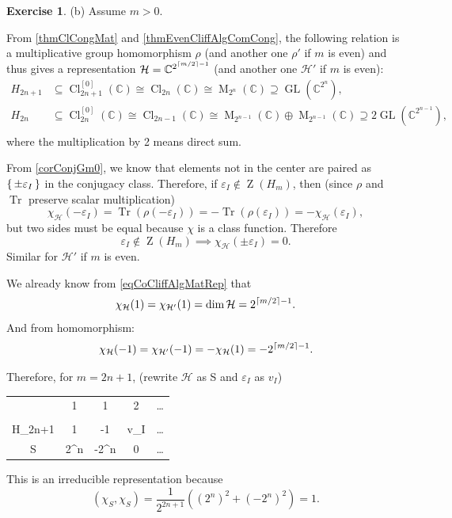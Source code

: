 \documentclass[12pt, letterpaper]{article}
\newcommand{\co}{\mathbb{C}}
\newcommand{\GL}{\operatorname{GL}}
\newcommand{\MM}{\operatorname{M}}
\newcommand{\ZZ}{\operatorname{Z}}
\newcommand{\Tr}{\operatorname{Tr}}
\newcommand{\Cl}{\operatorname{Cl}}
\DeclarePairedDelimiter\ceil{\lceil}{\rceil}
\theoremstyle{definition}
\theoremstyle{remark}
\theoremstyle{definition}
\newtheorem{exe}{Exercise}[section]
\theoremstyle{plain}
\numberwithin{equation}{section}
\begin{document}
	\begin{exe}\label{exe3.9}
		(b)
		Assume $m>0$.
		
		From \ref{thmClCongMat} and \ref{thmEvenCliffAlgComCong}, 
		the following relation is a multiplicative group homomorphism $\rho$ (and another one $\rho'$ if $m$ is even)
		and thus gives a representation $\mathcal{H}=\co^{2^{\ceil{m/2}-1}}$ (and another one $\mathcal{H}'$ if $m$ is even):
		\[
		\begin{aligned}
			H_{2n+1}&\subseteq\Cl_{2n+1}^{[0]}(\co)\cong\Cl_{2n}(\co)\cong\MM_{2^n}(\co)\supseteq \GL(\co^{2^n}),\\
			H_{2n}&\subseteq\Cl_{2n}^{[0]}(\co)\cong\Cl_{2n-1}(\co)\cong\MM_{2^{n-1}}(\co)\oplus\MM_{2^{n-1}}(\co)\supseteq2\GL(\co^{2^{n-1}}),\\
		\end{aligned}
		\]
		where the multiplication by 2 means direct sum.
		
		From \ref{corConjGm0}, we know that elements not in the center are paired as
		$\set{\pm \varepsilon_I}$ in the conjugacy class. Therefore, if $\varepsilon_I\notin \ZZ(H_m)$, then
		(since $\rho$ and $\Tr$ preserve scalar multiplication)
		\[\chi_{\mathcal{H}}(-\varepsilon_I)=\Tr(\rho(-\varepsilon_I))=-\Tr(\rho(\varepsilon_I))=-\chi_{\mathcal{H}}(\varepsilon_I), \]
		but two sides must be equal because $\chi$ is a class function.
		Therefore \[\varepsilon_I\notin \ZZ(H_m)\implies\chi_{\mathcal{H}}(\pm\varepsilon_I)=0.\]
		Similar for $\mathcal{H'}$ if $m$ is even.
		
		We already know from \eqref{eqCoCliffAlgMatRep} that
		\[\chi_{\mathcal{H}}(1)=\chi_{\mathcal{H}'}(1)=\dim \mathcal{H}=2^{\ceil{m/2}-1} .\]
		And from homomorphism:
		\[\chi_{\mathcal{H}}(-1) =\chi_{\mathcal{H}'}(-1)=-\chi_{\mathcal{H}}(1)=-2^{\ceil{m/2}-1} .\]
		
		Therefore, for $m=2n+1$, (rewrite $\mathcal{H}$ as S and $\varepsilon_I$ as $v_I$)
		\begin{center}
			\begin{tabular}{C | C C C C}
				& 1 & 1 & 2 & \dots \\
				\\
				H_{2n+1}& 1 & -1 & \pm v_I & \dots\\
				\hline
				S & 2^n & -2^n & 0 & \dots\\ 
			\end{tabular}
		\end{center}
	
		This is an irreducible representation because 
		\[(\chi_S,\chi_S)=\frac{1}{2^{2n+1}}((2^n)^2+(-2^n)^2)=1.\]
		

\end{exe}
\end{document}
